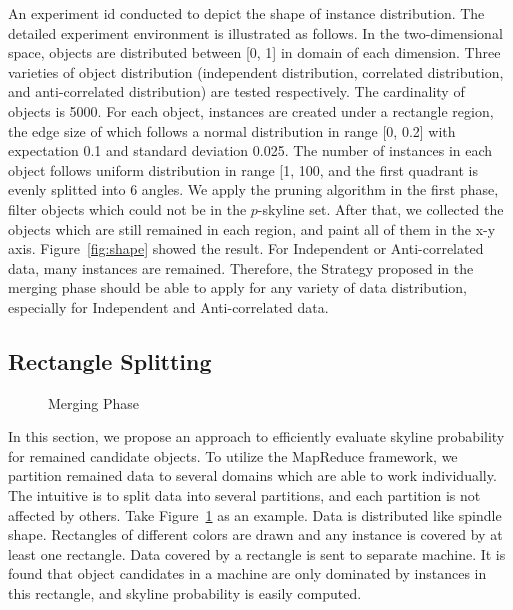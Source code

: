 An experiment id conducted to depict the shape of instance distribution. The detailed experiment environment is illustrated as follows. In the two-dimensional space, objects are distributed between [0, 1] in domain of each dimension. Three varieties of object distribution (independent distribution, correlated distribution, and anti-correlated distribution) are tested respectively. The cardinality of objects is 5000. For each object, instances are created under a rectangle region, the edge size of which follows a normal distribution in range [0, 0.2] with expectation 0.1 and standard deviation 0.025.
The number of instances in each object follows uniform distribution in range [1, 100, and the first quadrant is evenly splitted into 6 angles. We apply the pruning algorithm in the first phase, filter objects which could not be in the $p$-skyline set. After that, we collected the objects which are still remained in each region, and paint all of them in the x-y axis. Figure~\ref{fig:shape} showed the result. For Independent or Anti-correlated data, many instances are remained. Therefore, the Strategy proposed in the merging phase should be able to apply for any variety of data distribution, especially for Independent and Anti-correlated data.

\subsection{Rectangle Splitting}
\begin{figure}[t]
\vspace{-15pt}
\centering
  \centerline{}
  \caption{Merging Phase}
  \vspace{-15pt}
  \label{figure:gridMerge}
\end{figure}

In this section, we propose an approach to efficiently evaluate skyline probability for  remained candidate objects. To utilize the MapReduce framework, we partition remained data to several domains which are able to work individually. The intuitive is to split data into several partitions, and each partition is not affected by others. Take Figure~\ref{figure:gridMerge} as an example. Data is distributed like spindle shape. Rectangles of different colors are drawn and any instance is covered by at least one rectangle. Data covered by a rectangle is sent to separate machine. It is found that object candidates in a machine are only dominated by instances in this rectangle, and skyline probability is easily computed.


